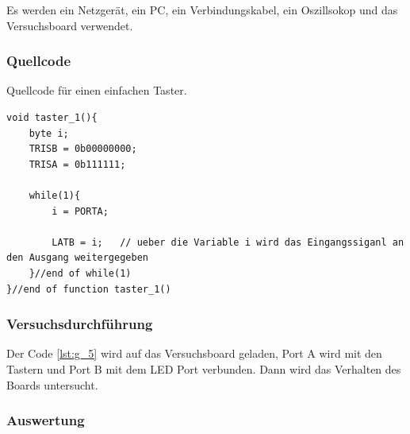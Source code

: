 \documentclass[12pt,a4paper]{article}
\begin{document}
Es werden ein Netzgerät, ein PC, ein Verbindungskabel, ein Oszillsokop und das Versuchsboard verwendet.

\subsubsection*{Quellcode}

Quellcode für einen einfachen Taster.

\lstset{language=C, basicstyle=\tiny}
\begin{lstlisting}[caption = {Einfachster Version eines Schalters}, label=lst:g_5,captionpos=b]
void taster_1(){
	byte i;
	TRISB = 0b00000000;
	TRISA = 0b111111;
	
	while(1){
		i = PORTA;
		
		LATB = i;	// ueber die Variable i wird das Eingangssiganl an den Ausgang weitergegeben
	}//end of while(1)
}//end of function taster_1()
\end{lstlisting}

\subsubsection*{Versuchsdurchführung}

Der Code \ref{lst:g_5} wird auf das Versuchsboard geladen, Port A wird mit den Tastern und Port B mit dem LED Port verbunden. Dann wird das Verhalten des Boards untersucht.

\subsubsection*{Auswertung}
\end{document}
